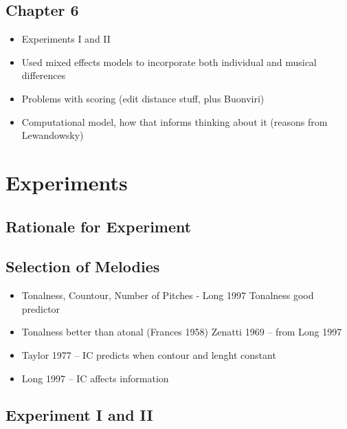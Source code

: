 \documentclass[]{book}
\providecommand{\tightlist}{%
  \setlength{\itemsep}{0pt}\setlength{\parskip}{0pt}}
\theoremstyle{definition}
\theoremstyle{definition}
\theoremstyle{definition}
\theoremstyle{remark}
\begin{document}
\hypertarget{chapter-6}{%
\section{Chapter 6}\label{chapter-6}}

\begin{itemize}
\item
  Experiments I and II
\item
  Used mixed effects models to incorporate both individual and musical
  differences
\item
  Problems with scoring (edit distance stuff, plus Buonviri)
\item
  Computational model, how that informs thinking about it (reasons from
  Lewandowsky)
\end{itemize}

\hypertarget{experiments}{%
\chapter{Experiments}\label{experiments}}

\hypertarget{rationale-for-experiment}{%
\section{Rationale for Experiment}\label{rationale-for-experiment}}

\hypertarget{selection-of-melodies}{%
\section{Selection of Melodies}\label{selection-of-melodies}}

\begin{itemize}
\tightlist
\item
  Tonalness, Countour, Number of Pitches - Long 1997 Tonalness good
  predictor
\item
  Tonalness better than atonal (Frances 1958) Zenatti 1969 -- from Long
  1997
\item
  Taylor 1977 -- IC predicts when contour and lenght constant
\item
  Long 1997 -- IC affects information
\end{itemize}

\hypertarget{experiment-i-and-ii}{%
\section{Experiment I and II}\label{experiment-i-and-ii}}
\end{document}
